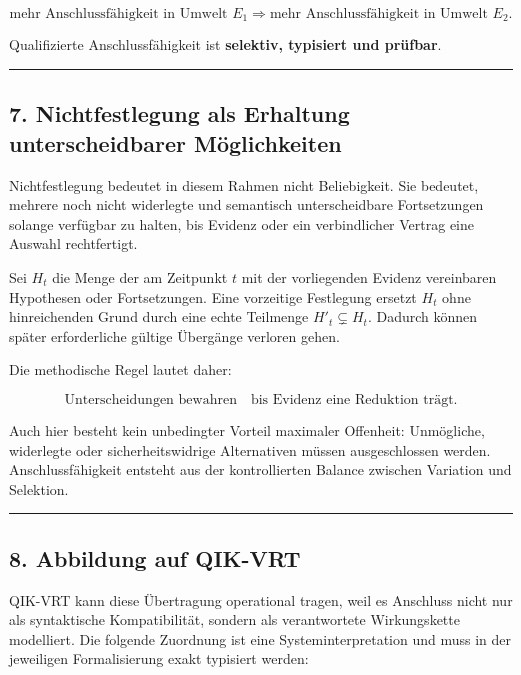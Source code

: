 \documentclass[
  10pt,
  a4paper,
]{article}
\begin{document}
\[
\text{mehr Anschlussfähigkeit in Umwelt }E_1
\Longrightarrow
\text{mehr Anschlussfähigkeit in Umwelt }E_2.
\]

Qualifizierte Anschlussfähigkeit ist \textbf{selektiv, typisiert und
prüfbar}.

\begin{center}\rule{0.5\linewidth}{0.5pt}\end{center}

\hypertarget{nichtfestlegung-als-erhaltung-unterscheidbarer-muxf6glichkeiten}{%
\subsection{7. Nichtfestlegung als Erhaltung unterscheidbarer
Möglichkeiten}\label{nichtfestlegung-als-erhaltung-unterscheidbarer-muxf6glichkeiten}}

Nichtfestlegung bedeutet in diesem Rahmen nicht Beliebigkeit. Sie
bedeutet, mehrere noch nicht widerlegte und semantisch unterscheidbare
Fortsetzungen solange verfügbar zu halten, bis Evidenz oder ein
verbindlicher Vertrag eine Auswahl rechtfertigt.

Sei \(H_t\) die Menge der am Zeitpunkt \(t\) mit der vorliegenden
Evidenz vereinbaren Hypothesen oder Fortsetzungen. Eine vorzeitige
Festlegung ersetzt \(H_t\) ohne hinreichenden Grund durch eine echte
Teilmenge \(H'_t\subsetneq H_t\). Dadurch können später erforderliche
gültige Übergänge verloren gehen.

Die methodische Regel lautet daher:

\[
\text{Unterscheidungen bewahren}
\quad\text{bis Evidenz eine Reduktion trägt.}
\]

Auch hier besteht kein unbedingter Vorteil maximaler Offenheit:
Unmögliche, widerlegte oder sicherheitswidrige Alternativen müssen
ausgeschlossen werden. Anschlussfähigkeit entsteht aus der
kontrollierten Balance zwischen Variation und Selektion.

\begin{center}\rule{0.5\linewidth}{0.5pt}\end{center}

\hypertarget{abbildung-auf-qik-vrt}{%
\subsection{8. Abbildung auf QIK-VRT}\label{abbildung-auf-qik-vrt}}

QIK-VRT kann diese Übertragung operational tragen, weil es Anschluss
nicht nur als syntaktische Kompatibilität, sondern als verantwortete
Wirkungskette modelliert. Die folgende Zuordnung ist eine
Systeminterpretation und muss in der jeweiligen Formalisierung exakt
typisiert werden:
\end{document}
